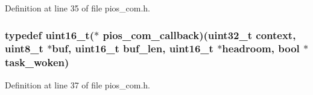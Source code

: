 Definition at line 35 of file pios\-\_\-com.\-h.

\hypertarget{group___p_i_o_s___c_o_m_ga23f1888821f1f74a50c02adc459df597}{
\subsubsection[{pios\-\_\-com\-\_\-callback}]{\setlength{\rightskip}{0pt plus 5cm}typedef {\bf uint16\-\_\-t}($\ast$ pios\-\_\-com\-\_\-callback)({\bf uint32\-\_\-t} context, {\bf uint8\-\_\-t} $\ast${\bf buf}, {\bf uint16\-\_\-t} buf\-\_\-len, {\bf uint16\-\_\-t} $\ast$headroom, {\bf bool} $\ast$task\-\_\-woken)}}\label{group___p_i_o_s___c_o_m_ga23f1888821f1f74a50c02adc459df597}


Definition at line 37 of file pios\-\_\-com.\-h.



